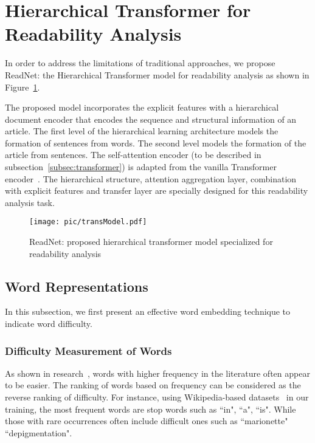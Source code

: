 \documentclass[runningheads]{llncs}
\begin{document}
  \section{Hierarchical Transformer for Readability Analysis}
 In order to address the limitations of traditional approaches, we propose ReadNet: the Hierarchical Transformer model for readability analysis as shown in Figure~\ref{fig:model}.



The proposed model incorporates the explicit features with a hierarchical document encoder that encodes the sequence and structural information of an article. The first level of the hierarchical learning architecture models the formation of sentences from words. The second level models the formation of the article from sentences. The self-attention encoder (to be described in subsection~\ref{subsec:transformer}) is adapted from the vanilla Transformer encoder~\cite{vaswani2017attention}. The hierarchical structure, attention aggregation layer, combination with explicit features and transfer layer are specially designed for this readability analysis task.

\begin{figure}[!ht]
\centering
    \vspace{-0.5cm}
	\texttt{[image: pic/transModel.pdf]}
	\caption{ReadNet: proposed hierarchical transformer model specialized for readability analysis \label{fig:model}}
	\vspace{-0.5cm}
\end{figure}




\iffalse
\subsection{Word Representations}

In this subsection, we first present an effective word embedding technique to indicate word difficulty.

\subsubsection{Difficulty Measurement of Words}
As shown in research~\cite{coxhead2000new,Lexicon},  words with higher frequency in the literature often appear to be easier. The ranking of words based on frequency can be considered as the reverse ranking of difficulty. For instance, using Wikipedia-based datasets~\cite{wikidata} in our training, the most frequent words are stop words such as ``in", ``a", ``is". While those with rare occurrences often include difficult ones such as ``marionette" ``depigmentation".
\end{document}

